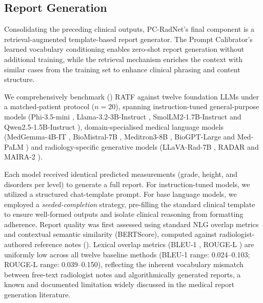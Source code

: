 \documentclass[journal]{IEEEtran}
\newcommand{\modelname}{PC-RadNet}
\begin{document}
\subsection{Report Generation}
\label{sec:report_results}

Consolidating the preceding clinical outputs, \modelname{}'s final component is a retrieval-augmented template-based report generator. The Prompt Calibrator's learned vocabulary conditioning enables zero-shot report generation without additional training, while the retrieval mechanism enriches the context with similar cases from the training set to enhance clinical phrasing and content structure.

We comprehensively benchmark () RATF against twelve foundation LLMs under a matched-patient protocol ($n=20$), spanning instruction-tuned general-purpose models (Phi-3.5-mini \cite{phi35mini2024}, Llama-3.2-3B-Instruct \cite{llama32_2024}, SmolLM2-1.7B-Instruct \cite{smollm2_2024} and Qwen2.5-1.5B-Instruct \cite{qwen25_2024}), domain-specialised medical language models (MedGemma-4B-IT \cite{medgemma2025}, BioMistral-7B \cite{biomistral2024}, Meditron3-8B \cite{sallinen2025llama3meditron}, BioGPT-Large \cite{luo2022biogpt} and Med-PaLM \cite{singhal2023medpalm2}) and radiology-specific generative models (LLaVA-Rad-7B \cite{zambranochaves2025llavarad}, RADAR \cite{sun2026radar} and MAIRA-2 \cite{bannur2024maira2}). 

Each model received identical predicted measurements (grade, height, and disorders per level) to generate a full report. For instruction-tuned models, we utilized a structured chat-template prompt. For base language models, we employed a \emph{seeded-completion} strategy, pre-filling the standard clinical template to ensure well-formed outputs and isolate clinical reasoning from formatting adherence. Report quality was first assessed using standard NLG overlap metrics and contextual semantic similarity (BERTScore), computed against radiologist-authored reference notes (). Lexical overlap metrics (BLEU-1 \cite{papineni2002bleu}, ROUGE-L \cite{lin2004rouge}) are uniformly low across all twelve baseline methods (BLEU-1 range: 0.024--0.103; ROUGE-L range: 0.039--0.150), reflecting the inherent vocabulary mismatch between free-text radiologist notes and algorithmically generated reports, a known and documented limitation widely discussed in the medical report generation literature.
\end{document}
